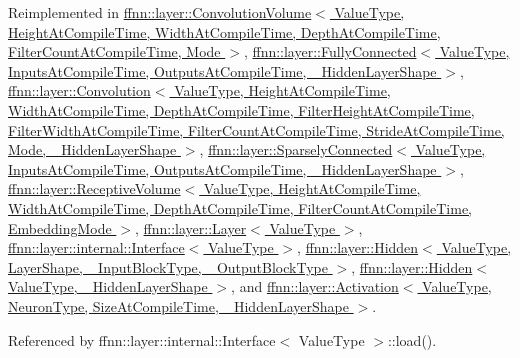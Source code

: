 Reimplemented in \hyperlink{classffnn_1_1layer_1_1_convolution_volume_a77f5965e61f450d0fe72fa091a3e667a}{ffnn\-::layer\-::\-Convolution\-Volume$<$ Value\-Type, Height\-At\-Compile\-Time, Width\-At\-Compile\-Time, Depth\-At\-Compile\-Time, Filter\-Count\-At\-Compile\-Time, Mode $>$}, \hyperlink{classffnn_1_1layer_1_1_fully_connected_a1ff2a601cdf315ce46a2812b4e6fe354}{ffnn\-::layer\-::\-Fully\-Connected$<$ Value\-Type, Inputs\-At\-Compile\-Time, Outputs\-At\-Compile\-Time, \-\_\-\-Hidden\-Layer\-Shape $>$}, \hyperlink{classffnn_1_1layer_1_1_convolution_ab7cbb5594feeb2f614e83e2fc8e2b491}{ffnn\-::layer\-::\-Convolution$<$ Value\-Type, Height\-At\-Compile\-Time, Width\-At\-Compile\-Time, Depth\-At\-Compile\-Time, Filter\-Height\-At\-Compile\-Time, Filter\-Width\-At\-Compile\-Time, Filter\-Count\-At\-Compile\-Time, Stride\-At\-Compile\-Time, Mode, \-\_\-\-Hidden\-Layer\-Shape $>$}, \hyperlink{classffnn_1_1layer_1_1_sparsely_connected_a0996cd78dc2f76cab36fac2ec5c8f323}{ffnn\-::layer\-::\-Sparsely\-Connected$<$ Value\-Type, Inputs\-At\-Compile\-Time, Outputs\-At\-Compile\-Time, \-\_\-\-Hidden\-Layer\-Shape $>$}, \hyperlink{classffnn_1_1layer_1_1_receptive_volume_aebfd8f149057b061d6880669376175e3}{ffnn\-::layer\-::\-Receptive\-Volume$<$ Value\-Type, Height\-At\-Compile\-Time, Width\-At\-Compile\-Time, Depth\-At\-Compile\-Time, Filter\-Count\-At\-Compile\-Time, Embedding\-Mode $>$}, \hyperlink{classffnn_1_1layer_1_1_layer_a23f5f3c958d888632010327471c7b012}{ffnn\-::layer\-::\-Layer$<$ Value\-Type $>$}, \hyperlink{classffnn_1_1layer_1_1internal_1_1_interface_a88b5bd86aafd361d3a84dc6cba211195}{ffnn\-::layer\-::internal\-::\-Interface$<$ Value\-Type $>$}, \hyperlink{classffnn_1_1layer_1_1_hidden_a4ab88bd0c94d86b6d17f63e054cc907c}{ffnn\-::layer\-::\-Hidden$<$ Value\-Type, Layer\-Shape, \-\_\-\-Input\-Block\-Type, \-\_\-\-Output\-Block\-Type $>$}, \hyperlink{classffnn_1_1layer_1_1_hidden_a4ab88bd0c94d86b6d17f63e054cc907c}{ffnn\-::layer\-::\-Hidden$<$ Value\-Type, \-\_\-\-Hidden\-Layer\-Shape $>$}, and \hyperlink{classffnn_1_1layer_1_1_activation_a045ecc330b67cdc3a41d6d7fc3a8dbf2}{ffnn\-::layer\-::\-Activation$<$ Value\-Type, Neuron\-Type, Size\-At\-Compile\-Time, \-\_\-\-Hidden\-Layer\-Shape $>$}.



Referenced by ffnn\-::layer\-::internal\-::\-Interface$<$ Value\-Type $>$\-::load().

